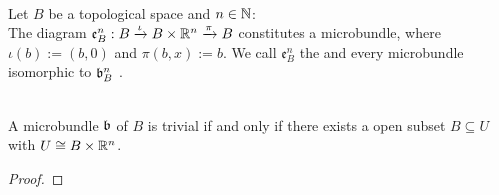\\Let $B$ be a topological space and $n \in \mathbb{N}$:
\\ The diagram $\mathfrak{e}^n_B: B \xrightarrow{\iota} B \times \mathbb{R}^n \xrightarrow{\pi} B{}$ constitutes a microbundle, where
$\iota(b) := (b, 0)$ and $\pi(b, x) := b$.
We call $\mathfrak{e}^n_B$ the  and every microbundle isomorphic to $\mathfrak{b}^n_B$ .

\\ A microbundle $\mathfrak{b}$ of $B$ is trivial if and only if there exists a open subset $B \subseteq U$ with $U \cong B \times \mathbb{R}^n$.
\begin{proof}
    
\end{proof}